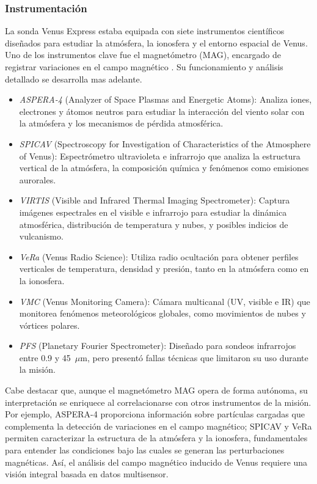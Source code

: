 \documentclass[letterpaper,11pt]{article}
\begin{document}
        
            \subsubsection{Instrumentación}
                La sonda Venus Express estaba equipada con siete instrumentos científicos diseñados para estudiar la atmósfera, la ionosfera y el entorno espacial de Venus. Uno de los instrumentos clave fue el magnetómetro (MAG), encargado de registrar variaciones en el campo magnético \cite{esa}. Su funcionamiento y análisis detallado se desarrolla mas adelante.

                \begin{itemize}
                    \item \textit{ASPERA-4} (Analyzer of Space Plasmas and Energetic Atoms): Analiza iones, electrones y átomos neutros para estudiar la interacción del viento solar con la atmósfera y los mecanismos de pérdida atmosférica.
                    \item \textit{SPICAV} (Spectroscopy for Investigation of Characteristics of the Atmosphere of Venus): Espectrómetro ultravioleta e infrarrojo que analiza la estructura vertical de la atmósfera, la composición química y fenómenos como emisiones aurorales.
                    \item \textit{VIRTIS} (Visible and Infrared Thermal Imaging Spectrometer): Captura imágenes espectrales en el visible e infrarrojo para estudiar la dinámica atmosférica, distribución de temperatura y nubes, y posibles indicios de vulcanismo.
                    \item \textit{VeRa} (Venus Radio Science): Utiliza radio ocultación para obtener perfiles verticales de temperatura, densidad y presión, tanto en la atmósfera como en la ionosfera.

                    \item \textit{VMC} (Venus Monitoring Camera): Cámara multicanal (UV, visible e IR) que monitorea fenómenos meteorológicos globales, como movimientos de nubes y vórtices polares.

                    \item \textit{PFS} (Planetary Fourier Spectrometer): Diseñado para sondeos infrarrojos entre 0.9 y 45~$\mu$m, pero presentó fallas técnicas que limitaron su uso durante la misión.
                \end{itemize}
\vspace{0.2cm}
                Cabe destacar que, aunque el magnetómetro MAG opera de forma autónoma, su interpretación se enriquece al correlacionarse con otros instrumentos de la misión. Por ejemplo, ASPERA-4 proporciona información sobre partículas cargadas que complementa la detección de variaciones en el campo magnético; SPICAV y VeRa permiten caracterizar la estructura de la atmósfera y la ionosfera, fundamentales para entender las condiciones bajo las cuales se generan las perturbaciones magnéticas. Así, el análisis del campo magnético inducido de Venus requiere una visión integral basada en datos multisensor.
\end{document}
